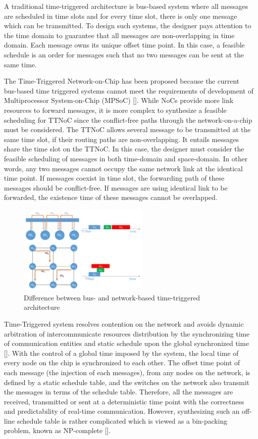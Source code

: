 \documentclass[conference]{IEEEtran}
\begin{document}
A traditional time-triggered architecture is bus-based system where all messages are scheduled in time slots and for every time slot, there is only one message which can be transmitted. To design such systems, the designer pays attention to the time domain to guarantee that all messages are non-overlapping in time domain. Each message owns its unique offset time point. In this case, a feasible schedule is an order for messages such that no two messages can be sent at the same time. 

The Time-Triggered Network-on-Chip has been proposed because the current bus-based time triggered systems cannot meet the requirements of development of Multiprocessor System-on-Chip (MPSoC) []. While NoCs provide more link resources to forward messages, it is more complex to synthesize a feasible scheduling for TTNoC since the conflict-free paths through the network-on-a-chip must be considered. The TTNoC allows several message to be transmitted at the same time slot, if their routing paths are non-overlapping. It entails messages share the time slot on the TTNoC. In this case, the designer must consider the feasible scheduling of messages in both time-domain and space-domain. In other words, any two messages cannot occupy the same network link at the identical time point. If messages coexist in time slot, the forwarding path of these messages should be conflict-free. If messages are using identical link to be forwarded, the existence time of these messages cannot be overlapped.

\begin{figure}[!t]
	\centering
	\includegraphics[width=2.5in]{picture/difference.pdf}
	\caption{Difference between bus- and network-based time-triggered architecture}
	\label{f:arch}
\end{figure}

Time-Triggered system resolves contention on the network and avoids dynamic arbitration of intercommunicate resources distribution by the synchronizing time of communication entities and static schedule upon the global synchronized time []. With the control of a global time imposed by the system, the local time of every node on the chip is synchronized to each other. The offset time point of each message (the injection of each messages), from any nodes on the network, is defined by a static schedule table, and the switches on the network also transmit the messages in terms of the schedule table. Therefore, all the messages are received, transmitted or sent at a deterministic time point with the correctness and predictability of real-time communication. However, synthesizing such an off-line schedule table is rather complicated which is viewed as a bin-packing problem, known as NP-complete [].
\end{document}
